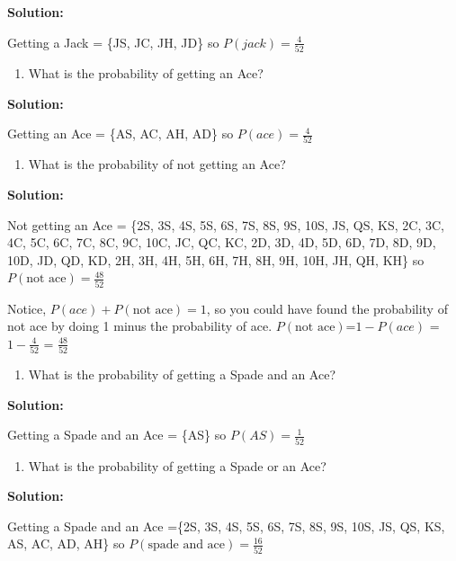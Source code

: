 \documentclass[]{book}
\providecommand{\tightlist}{%
  \setlength{\itemsep}{0pt}\setlength{\parskip}{0pt}}
\begin{document}
\textbf{Solution:}

Getting a Jack = \{JS, JC, JH, JD\} so \(P(jack)=\frac{4}{52}\)

\begin{enumerate}
\def\labelenumi{\alph{enumi}.}
\setcounter{enumi}{3}
\tightlist
\item
  What is the probability of getting an Ace?
\end{enumerate}

\textbf{Solution:}

Getting an Ace = \{AS, AC, AH, AD\} so \(P(ace)=\frac{4}{52}\)

\begin{enumerate}
\def\labelenumi{\alph{enumi}.}
\setcounter{enumi}{4}
\tightlist
\item
  What is the probability of not getting an Ace?
\end{enumerate}

\textbf{Solution:}

Not getting an Ace = \{2S, 3S, 4S, 5S, 6S, 7S, 8S, 9S, 10S, JS, QS, KS, 2C, 3C, 4C, 5C, 6C, 7C, 8C, 9C, 10C, JC, QC, KC, 2D, 3D, 4D, 5D, 6D, 7D, 8D, 9D, 10D, JD, QD, KD, 2H, 3H, 4H, 5H, 6H, 7H, 8H, 9H, 10H, JH, QH, KH\} so \(P(\text{not ace})=\frac{48}{52}\)

Notice, \(P(ace)+P(\text{not ace})=1\), so you could have found the probability of not ace by doing 1 minus the probability of ace. \(P(\text{not ace})\)=\(1-P(ace)\) = \(1-\frac{4}{52}\) = \(\frac{48}{52}\)

\begin{enumerate}
\def\labelenumi{\alph{enumi}.}
\setcounter{enumi}{5}
\tightlist
\item
  What is the probability of getting a Spade and an Ace?
\end{enumerate}

\textbf{Solution:}

Getting a Spade and an Ace = \{AS\} so \(P(AS)=\frac{1}{52}\)

\begin{enumerate}
\def\labelenumi{\alph{enumi}.}
\setcounter{enumi}{6}
\tightlist
\item
  What is the probability of getting a Spade or an Ace?
\end{enumerate}

\textbf{Solution:}

Getting a Spade and an Ace =\{2S, 3S, 4S, 5S, 6S, 7S, 8S, 9S, 10S, JS, QS, KS, AS, AC, AD, AH\} so \(P(\text{spade and ace})=\frac{16}{52}\)
\end{document}
